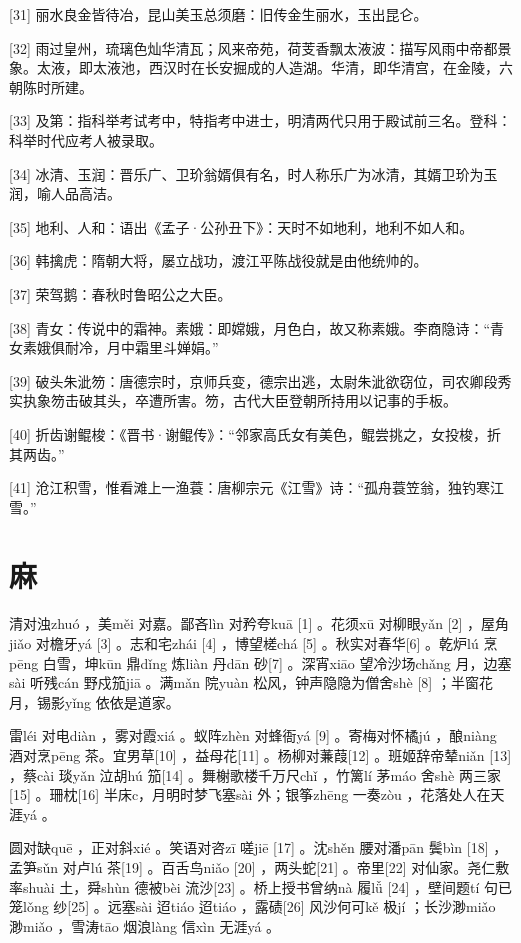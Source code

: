 \documentclass[12pt,UTF8]{ctexbook}
\begin{document}
[31] 丽水良金皆待冶，昆山美玉总须磨：旧传金生丽水，玉出昆仑。

[32] 雨过皇州，琉璃色灿华清瓦；风来帝苑，荷芰香飘太液波：描写风雨中帝都景象。太液，即太液池，西汉时在长安掘成的人造湖。华清，即华清宫，在金陵，六朝陈时所建。

[33] 及第：指科举考试考中，特指考中进士，明清两代只用于殿试前三名。登科：科举时代应考人被录取。

[34] 冰清、玉润：晋乐广、卫玠翁婿俱有名，时人称乐广为冰清，其婿卫玠为玉润，喻人品高洁。

[35] 地利、人和：语出《孟子·公孙丑下》：天时不如地利，地利不如人和。

[36] 韩擒虎：隋朝大将，屡立战功，渡江平陈战役就是由他统帅的。

[37] 荣驾鹅：春秋时鲁昭公之大臣。

[38] 青女：传说中的霜神。素娥：即嫦娥，月色白，故又称素娥。李商隐诗：“青女素娥俱耐冷，月中霜里斗婵娟。”

[39] 破头朱泚笏：唐德宗时，京师兵变，德宗出逃，太尉朱泚欲窃位，司农卿段秀实执象笏击破其头，卒遭所害。笏，古代大臣登朝所持用以记事的手板。

[40] 折齿谢鲲梭：《晋书·谢鲲传》：“邻家高氏女有美色，鲲尝挑之，女投梭，折其两齿。”

[41] 沧江积雪，惟看滩上一渔蓑：唐柳宗元《江雪》诗：“孤舟蓑笠翁，独钓寒江雪。”





\chapter{麻}


清对浊zhuó ，美měi 对嘉。鄙吝lìn 对矜夸kuā [1] 。花须xū 对柳眼yǎn [2] ，屋角jiǎo 对檐牙yá [3] 。志和宅zhái [4] ，博望槎chá [5] 。秋实对春华[6] 。乾炉lú 烹pēng 白雪，坤kūn 鼎dǐng 炼liàn 丹dān 砂[7] 。深宵xiāo 望冷沙场chǎng 月，边塞sài 听残cán 野戍笳jiā 。满mǎn 院yuàn 松风，钟声隐隐为僧舍shè [8] ；半窗花月，锡影yǐng 依依是道家。

雷léi 对电diàn ，雾对霞xiá 。蚁阵zhèn 对蜂衙yá [9] 。寄梅对怀橘jú ，酿niàng 酒对烹pēng 茶。宜男草[10] ，益母花[11] 。杨柳对蒹葭[12] 。班姬辞帝辇niǎn [13] ，蔡cài 琰yǎn 泣胡hú 笳[14] 。舞榭歌楼千万尺chǐ ，竹篱lí 茅máo 舍shè 两三家[15] 。珊枕[16] 半床c，月明时梦飞塞sài 外；银筝zhēng 一奏zòu ，花落处人在天涯yá 。

圆对缺quē ，正对斜xié 。笑语对咨zī 嗟jiē [17] 。沈shěn 腰对潘pān 鬓bìn [18] ，孟笋sǔn 对卢lú 茶[19] 。百舌鸟niǎo [20] ，两头蛇[21] 。帝里[22] 对仙家。尧仁敷率shuài 土，舜shùn 德被bèi 流沙[23] 。桥上授书曾纳nà 履lǚ [24] ，壁间题tí 句已笼lǒng 纱[25] 。远塞sài 迢tiáo 迢tiáo ，露碛[26] 风沙何可kě 极jí ；长沙渺miǎo 渺miǎo ，雪涛tāo 烟浪làng 信xìn 无涯yá 。
\end{document}
